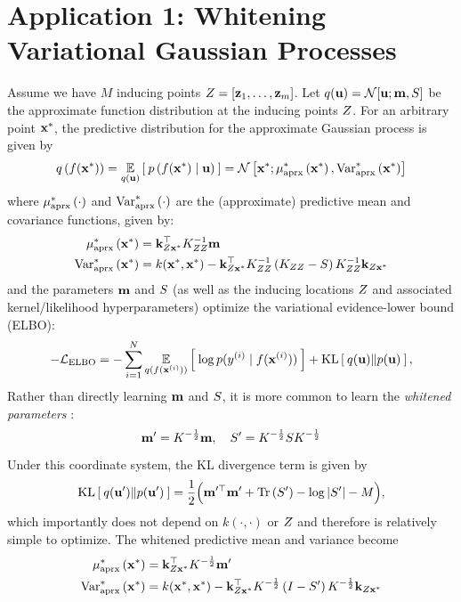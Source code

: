 \section{Application 1: Whitening Variational Gaussian Processes}
\label{sec:variational_results}


Assume we have $M$ inducing points $Z = [\mathbf{z}_1, \ldots, \mathbf{z}_m]$.
Let $q(\bu) = \normaldist{\bu; \bm}{\bS}$ be the approximate function distribution at the inducing points $Z$.
For an arbitrary point $\mathbf{x}^*$, the predictive distribution for the approximate Gaussian process is given by
%
\begin{equation}
  q \left( f(\bxtest) \right) = \Evover{q(\bu)}{ \: p\left( f(\bxtest) \mid \bu \right) \: }
  = \normaldist{ \bxtest; \ameantest{ \bxtest }} { \avartest{ \bxtest }}
  \label{eqn:approx_pred}
\end{equation}
%
where $\mu^*_\text{aprx} \left( \cdot \right)$ and $\text{Var}^*_\text{aprx} \left( \cdot \right)$ are the (approximate) predictive mean and covariance functions, given by:
%
\begin{align}
  \mu^*_\text{aprx} \left( \mathbf{x}^* \right) &= \mathbf{k}_{Z\mathbf{x}^*}^\top K_{ZZ}^{-1} \mathbf{m}
  \label{eqn:approx_pred_mean} \\
  \text{Var}^*_\text{aprx} \left( \mathbf{x}^* \right) &= k(\mathbf{x}^*, \mathbf{x}^*) -
    \mathbf{k}_{Z\mathbf{x}^*}^\top K_{ZZ}^{-1} \left( K_{ZZ} - S \right) K_{ZZ}^{-1} \mathbf{k}_{Z\mathbf{x}^*}
  \label{eqn:approx_pred_covar}
\end{align}
%
and the parameters $\mathbf{m}$ and $S$ (as well as the inducing locations $Z$ and associated kernel/likelihood hyperparameters) optimize the variational evidence-lower bound (ELBO):
%
\begin{align}
	-\mathcal L_\text{ELBO} = -\sum_{i=1}^N \operatorname*{\mathbb{E}}_{q(f(\mathbf{x}^{(i)}))} \left[   \: \log p( y^{(i)} \mid f(\mathbf{x}^{(i)}) ) \:  \right] + \operatorname*{KL} \left[ \:  q(\mathbf{u})  \Vert  p(\mathbf{u})  \: \right],
	\label{eqn:elbo}
	\nonumber
\end{align}
%
Rather than directly learning $\mathbf{m}$ and $S$, it is more common to learn the \emph{whitened parameters} \cite{kuss2005assessing,matthews2017scalable}:
\[ \mathbf{m}' = K^{-\frac 1 2} \mathbf{m}, \quad S' = K^{-\frac 1 2} S K^{-\frac 1 2} \]
Under this coordinate system, the KL divergence term is given by
%
\begin{equation}
	\kl{ q(\bu') }{ p(\bu') } = \frac{1}{2} \Bigl( \bm^{\prime \top} \bm' + \tr{ \bS' } - \log \vert \bS' \vert - M \Bigr),
	\label{eqn:kldiv_whitened}
\end{equation}
%
which importantly does not depend on $k(\cdot,\cdot)$ or $Z$ and therefore is relatively simple to optimize.
The whitened predictive mean and variance become
%
\begin{align}
  \mu^*_\text{aprx} \left( \mathbf{x}^* \right) &= \mathbf{k}_{Z\mathbf{x}^*}^\top K^{-\frac 1 2} \mathbf{m}'
  \label{eqn:approx_pred_mean} \\
  \text{Var}^*_\text{aprx} \left( \mathbf{x}^* \right) &= k(\mathbf{x}^*, \mathbf{x}^*) -
    \mathbf{k}_{Z\mathbf{x}^*}^\top K^{-\frac 1 2} \left( I - S' \right) K^{-\frac 1 2} \mathbf{k}_{Z\mathbf{x}^*}
  \label{eqn:approx_pred_covar}
\end{align}

